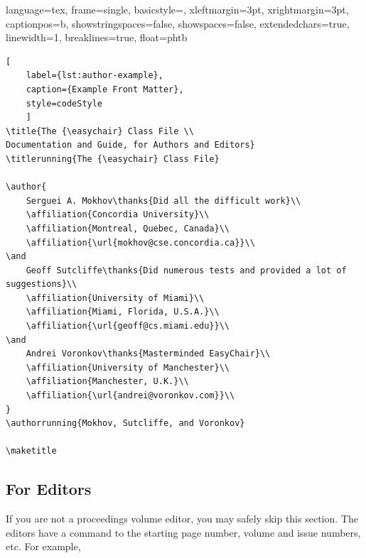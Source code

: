 \documentclass{easychair}
\newcommand{\easychair}{\sf{easychair}}
\begin{document}
{
	language=tex,
	frame=single,
	basicstyle=\scriptsize,
	xleftmargin=3pt,
	xrightmargin=3pt,
	captionpos=b,
	showstringspaces=false,
	showspaces=false,
	extendedchars=true,
	linewidth=1\linewidth,
	breaklines=true,
	float=phtb
}

\begin{lstlisting}[
    label={lst:author-example},
    caption={Example Front Matter},
    style=codeStyle
    ]
\title{The {\easychair} Class File \\
Documentation and Guide, for Authors and Editors}
\titlerunning{The {\easychair} Class File}

\author{
    Serguei A. Mokhov\thanks{Did all the difficult work}\\
    \affiliation{Concordia University}\\
    \affiliation{Montreal, Quebec, Canada}\\
    \affiliation{\url{mokhov@cse.concordia.ca}}\\
\and
    Geoff Sutcliffe\thanks{Did numerous tests and provided a lot of suggestions}\\
    \affiliation{University of Miami}\\
    \affiliation{Miami, Florida, U.S.A.}\\
    \affiliation{\url{geoff@cs.miami.edu}}\\
\and
    Andrei Voronkov\thanks{Masterminded EasyChair}\\
    \affiliation{University of Manchester}\\
    \affiliation{Manchester, U.K.}\\
    \affiliation{\url{andrei@voronkov.com}}\\
}
\authorrunning{Mokhov, Sutcliffe, and Voronkov}

\maketitle
\end{lstlisting}


\subsection{For Editors}
\label{sect:for-editors}

If you are not a proceedings volume editor, you may safely skip this section.
The editors have a command to the starting page number, volume and issue 
numbers, etc. For example,
\end{document}
